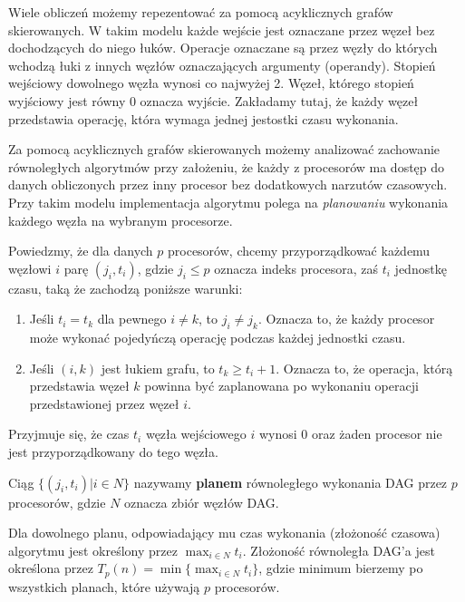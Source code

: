 Wiele obliczeń możemy repezentować za pomocą acyklicznych grafów skierowanych. W takim modelu każde wejście jest oznaczane przez węzeł bez dochodzących do niego łuków. Operacje oznaczane są przez węzły do których wchodzą łuki z innych węzłów oznaczających argumenty (operandy). Stopień wejściowy dowolnego węzła wynosi co najwyżej 2. Węzeł, którego stopień wyjściowy jest równy \(0\) oznacza wyjście. Zakładamy tutaj, że każdy węzeł przedstawia operację, która wymaga jednej jestostki czasu wykonania.

Za pomocą acyklicznych grafów skierowanych możemy analizować zachowanie równoległych algorytmów przy założeniu, że każdy z procesorów ma dostęp do danych obliczonych przez inny procesor bez dodatkowych narzutów czasowych. Przy takim modelu implementacja algorytmu polega na \emph{planowaniu} wykonania każdego węzła na wybranym procesorze.

Powiedzmy, że dla danych \(p\) procesorów, chcemy przyporządkować każdemu węzłowi \(i\) parę \((j_i, t_i)\), gdzie \(j_i \leq p\) oznacza indeks procesora, zaś \(t_i\) jednostkę czasu, taką że zachodzą poniższe warunki:
\begin{enumerate}
\item Jeśli \(t_i=t_k\) dla pewnego \(i\neq k\), to \(j_i\neq j_k\). Oznacza to, że każdy procesor może wykonać pojedyńczą operację podczas każdej jednostki czasu.
\item Jeśli \((i, k)\) jest łukiem grafu, to \(t_k\geq t_i + 1\). Oznacza to, że operacja, którą przedstawia węzeł \(k\) powinna być zaplanowana po wykonaniu operacji przedstawionej przez węzeł \(i\).
\end{enumerate}

Przyjmuje się, że czas \(t_i\) węzła wejściowego \(i\) wynosi 0 oraz żaden procesor nie jest przyporządkowany do tego węzła.\\
\begin{definicja}[Plan]\label{def:plan}
Ciąg \(\{(j_i, t_i) | i\in N\}\) nazywamy \textbf{planem} równoległego wykonania DAG przez \(p\) procesorów, gdzie \(N\) oznacza zbiór węzłów DAG.
\end{definicja}


Dla dowolnego planu, odpowiadający mu czas wykonania (złożoność czasowa) algorytmu jest określony przez \(\max_{i\in N}t_i\). Złożoność równoległa DAG'a jest określona przez \(T_{p}(n) = \min{\{\max_{i\in N}t_i\}}\), gdzie minimum bierzemy po wszystkich planach, które używają \(p\) procesorów.


